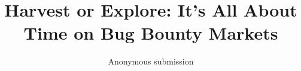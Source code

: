 \documentclass[runningheads]{llncs}
\begin{document}
\title{\large Harvest or Explore: It's All About Time on Bug Bounty Markets}%

\author{Anonymous submission}
\date{}

\maketitle

\begin{abstract}

\end{abstract}




%






\end{document}
